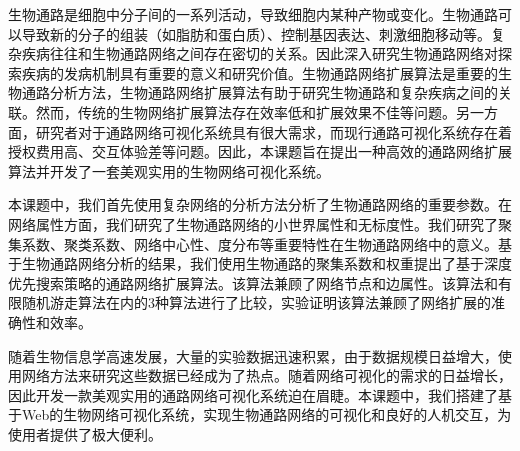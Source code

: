 \begin{cabstract}

生物通路是细胞中分子间的一系列活动，导致细胞内某种产物或变化。生物通路可以导致新的分子的组装（如脂肪和蛋白质）、控制基因表达、刺激细胞移动等。复杂疾病往往和生物通路网络之间存在密切的关系。因此深入研究生物通路网络对探索疾病的发病机制具有重要的意义和研究价值。生物通路网络扩展算法是重要的生物通路分析方法，生物通路网络扩展算法有助于研究生物通路和复杂疾病之间的关联。然而，传统的生物网络扩展算法存在效率低和扩展效果不佳等问题。另一方面，研究者对于通路网络可视化系统具有很大需求，而现行通路可视化系统存在着授权费用高、交互体验差等问题。因此，本课题旨在提出一种高效的通路网络扩展算法并开发了一套美观实用的生物网络可视化系统。

本课题中，我们首先使用复杂网络的分析方法分析了生物通路网络的重要参数。在网络属性方面，我们研究了生物通路网络的小世界属性和无标度性。我们研究了聚集系数、聚类系数、网络中心性、度分布等重要特性在生物通路网络中的意义。基于生物通路网络分析的结果，我们使用生物通路的聚集系数和权重提出了基于深度优先搜索策略的通路网络扩展算法。该算法兼顾了网络节点和边属性。该算法和有限随机游走算法在内的3种算法进行了比较，实验证明该算法兼顾了网络扩展的准确性和效率。

随着生物信息学高速发展，大量的实验数据迅速积累，由于数据规模日益增大，使用网络方法来研究这些数据已经成为了热点。随着网络可视化的需求的日益增长，因此开发一款美观实用的通路网络可视化系统迫在眉睫。本课题中，我们搭建了基于Web的生物网络可视化系统，实现生物通路网络的可视化和良好的人机交互，为使用者提供了极大便利。

\end{cabstract}


